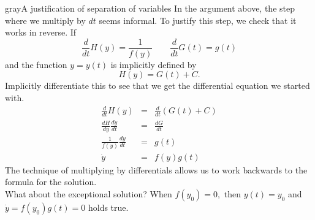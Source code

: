 \begin{mybox}{gray}{A justification of separation of variables}
  In the argument above, the step where we multiply by $dt$ seems informal.
  To justify this step, we check that it works in reverse. If
  \begin{equation*}
    \displaystyle \frac{d}{dt} H(y) = \frac{1}{f(y)} \qquad \frac{d}{dt} G(t) = g(t)
  \end{equation*}
  and the function $y = y(t)$ is implicitly defined by
  \begin{equation*}
    \displaystyle H(y) = G(t) + C.
  \end{equation*}
  Implicitly differentiate this to see that we get the differential equation we started with.
  \begin{eqnarray*}
    \displaystyle \frac{d}{dt} H(y) &\displaystyle =&   \displaystyle \frac{d}{dt}\left( G(t) + C\right)\\
    \displaystyle \frac{dH}{dy} \frac{dy}{dt}  &\displaystyle =&   \displaystyle \frac{dG}{dt} \\
    \displaystyle \frac{1}{f(y)} \frac{dy}{dt}  &\displaystyle =&  \displaystyle g(t) \\
    \displaystyle \dot y &\displaystyle =&  \displaystyle f(y) g(t)
  \end{eqnarray*}
  The technique of multiplying by differentials allows us to work backwards to the formula for the solution. \\
  What about the exceptional solution? When $f(y_0) = 0,$ then $y(t) = y_0$ and $\dot y = f(y_0)g(t) = 0$
  holds true.
\end{mybox}
\clearpage

